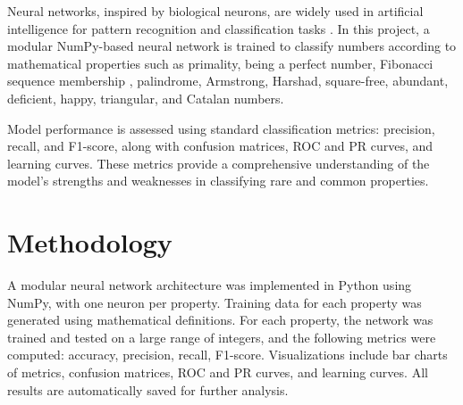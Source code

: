 \documentclass[twoside]{article}
\begin{document}
\begin{multicols}{2}
Neural networks, inspired by biological neurons, are widely used in artificial intelligence for pattern recognition and classification tasks \cite{neuralnetwork}. In this project, a modular NumPy-based neural network is trained to classify numbers according to mathematical properties such as primality, being a perfect number, Fibonacci sequence membership \cite{fibonnacisequence}, palindrome, Armstrong, Harshad, square-free, abundant, deficient, happy, triangular, and Catalan numbers.

Model performance is assessed using standard classification metrics: precision, recall, and F1-score, along with confusion matrices, ROC and PR curves, and learning curves. These metrics provide a comprehensive understanding of the model's strengths and weaknesses in classifying rare and common properties.

\section{Methodology}
A modular neural network architecture was implemented in Python using NumPy, with one neuron per property. Training data for each property was generated using mathematical definitions. For each property, the network was trained and tested on a large range of integers, and the following metrics were computed: accuracy, precision, recall, F1-score. Visualizations include bar charts of metrics, confusion matrices, ROC and PR curves, and learning curves. All results are automatically saved for further analysis.


\end{multicols}
\end{document}
